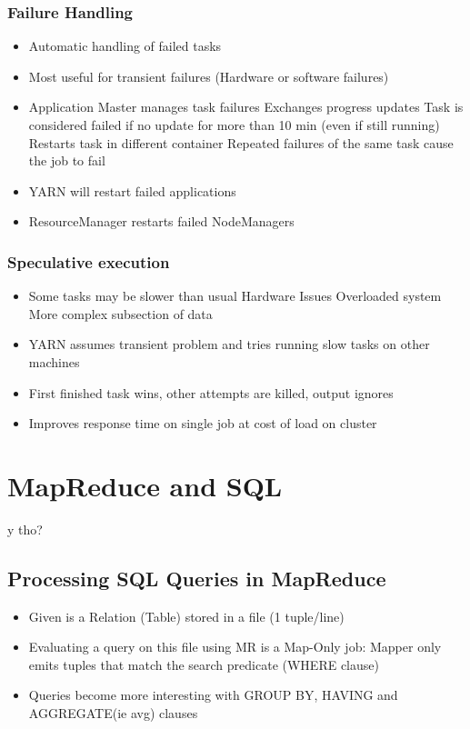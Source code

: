 \documentclass[10pt,a4paper]{scrreprt}
\begin{document}
\subsection{Failure Handling}
\begin{itemize}
	\item Automatic handling of failed tasks
	\item Most useful for transient failures (Hardware or software failures)
	\item Application Master manages task failures
	\subitem Exchanges progress updates
	\subitem Task is considered failed if no update for more than 10 min (even if still running)
	\subitem Restarts task in different container
	\subitem Repeated failures of the same task cause the job to fail
	\item YARN will restart failed applications
	\item ResourceManager restarts failed NodeManagers
\end{itemize}

\subsection{Speculative execution}
\begin{itemize}
	\item Some tasks may be slower than usual
	\subitem Hardware Issues
	\subitem Overloaded system
	\subitem More complex subsection of data
	\item YARN assumes transient problem and tries running slow tasks on other machines
	\item First finished task wins, other attempts are killed, output ignores
	\item Improves response time on single job at cost of load on cluster
\end{itemize}



\chapter{MapReduce and SQL}

y tho?
\section{Processing SQL Queries in MapReduce}
\begin{itemize}
	\item Given is a Relation (Table) stored in a file (1 tuple/line)
	\item Evaluating a query on this file using MR is a Map-Only job:
	\subitem Mapper only emits tuples that match the search predicate (WHERE clause)
	\item Queries become more interesting with GROUP BY, HAVING and AGGREGATE(ie avg) clauses
\end{itemize}
\end{document}

